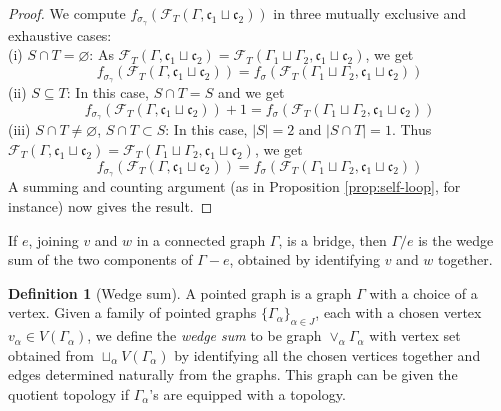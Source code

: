 \documentclass[10pt, reqno]{amsart}
\newcommand{\bgd}{\begin{displaymath}}
\newcommand{\edd}{\end{displaymath}}
\newcommand{\hf}{\hspace*{0.5cm}}
\theoremstyle{plain}
\theoremstyle{remark}
\theoremstyle{definition}
\newtheorem{defn}[theorem]{Definition}
\newtheorem{eg}[theorem]{Example}
\numberwithin{equation}{section}
\begin{document}
\begin{proof}
We compute $f_{\sigma_\gamma}(\mathscr{F}_T(\Gamma,\mathfrak{c}_1\sqcup\mathfrak{c}_2))$ in three mutually exclusive and exhaustive cases:\\
\hf (i) $S\cap T=\varnothing$: As $\mathscr{F}_T(\Gamma,\mathfrak{c}_1\sqcup\mathfrak{c}_2)=\mathscr{F}_T(\Gamma_1\sqcup\Gamma_2,\mathfrak{c}_1\sqcup\mathfrak{c}_2)  $, we get 
$$f_{\sigma_\gamma}(\mathscr{F}_T(\Gamma,\mathfrak{c}_1\sqcup\mathfrak{c}_2))=f_{\sigma}(\mathscr{F}_T(\Gamma_1\sqcup\Gamma_2,\mathfrak{c}_1\sqcup\mathfrak{c}_2))$$
\hf (ii) $S\subseteq T$: In this case, $S\cap T =S$ and we get
$$f_{\sigma_\gamma}(\mathscr{F}_T(\Gamma,\mathfrak{c}_1\sqcup\mathfrak{c}_2))+1=f_{\sigma}(\mathscr{F}_T(\Gamma_1\sqcup\Gamma_2,\mathfrak{c}_1\sqcup\mathfrak{c}_2))$$        
\hf (iii) $S\cap T\neq\varnothing$, $S\cap T\subset S$: In this case, $|S|=2$ and $|S\cap T|=1$. Thus $\mathscr{F}_T(\Gamma,\mathfrak{c}_1\sqcup\mathfrak{c}_2)=\mathscr{F}_T(\Gamma_1\sqcup\Gamma_2,\mathfrak{c}_1\sqcup\mathfrak{c}_2)  $, we get 
$$f_{\sigma_\gamma}(\mathscr{F}_T(\Gamma,\mathfrak{c}_1\sqcup\mathfrak{c}_2))=f_{\sigma}(\mathscr{F}_T(\Gamma_1\sqcup\Gamma_2,\mathfrak{c}_1\sqcup\mathfrak{c}_2))$$
A summing and counting argument (as in Proposition \ref{prop:self-loop}, for instance) now gives the result.
\end{proof}
\hf If $e$, joining $v$ and $w$ in a connected graph $\Gamma$, is a bridge, then $\Gamma/e$ is the wedge sum of the two components of $\Gamma-e$, obtained by identifying $v$ and $w$ together. 
\begin{defn}[Wedge sum]
A pointed graph is a graph $\Gamma$ with a choice of a vertex. Given a family of pointed graphs $\{\Gamma_\alpha\}_{\alpha\in J}$, each with a chosen vertex $v_\alpha\in V(\Gamma_\alpha)$, we define the {\it wedge sum} to be graph $\vee_\alpha \Gamma_\alpha$ with vertex set obtained from $\sqcup_\alpha  V(\Gamma_\alpha)$ by identifying all the chosen vertices together and edges determined naturally from the graphs. This graph can be given the quotient topology if $\Gamma_\alpha$'s are equipped with a topology. 
\end{defn}
\end{document}
